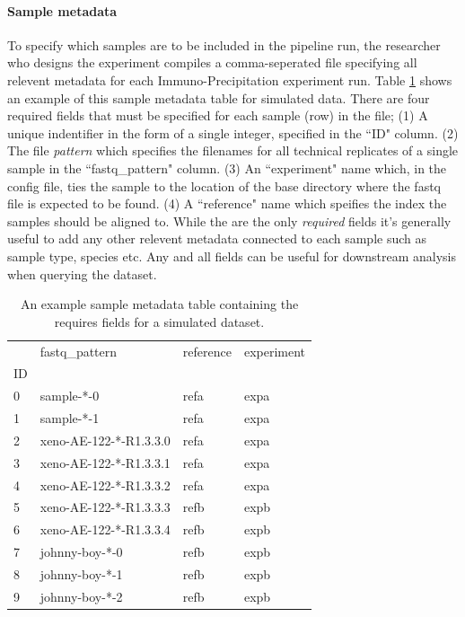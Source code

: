 \documentclass{article}
\begin{document}
\paragraph{Sample metadata}
To specify which samples are to be included in the pipeline run, 
the researcher who designs the experiment compiles a comma-seperated file specifying all relevent metadata for each Immuno-Precipitation experiment run. 
Table \ref{tab:sample_metadata} shows an example of this sample metadata table for simulated data.
There are four required fields that must be specified for each sample (row) in the file;
(1) A unique indentifier in the form of a single integer, specified in the ``ID" column.
(2) The file \textit{pattern} which specifies the filenames for all technical replicates of a single sample in the ``fastq\_pattern" column.
(3) An ``experiment" name which, in the config file, ties the sample to the location of the base directory where the fastq file is expected to be found.
(4) A ``reference" name which speifies the index the samples should be aligned to.
While the are the only \textit{required} fields it's generally useful to add any other relevent metadata connected to each sample such as sample type, species etc.
Any and all fields can be useful for downstream analysis when querying the dataset. 

\begin{table}[h!!!!]
\centering
\begin{tabular}{llll}
\toprule
{} &           fastq\_pattern & reference & experiment \\
ID &                         &           &            \\
\midrule
0  &              sample-*-0 &      refa &       expa \\
1  &              sample-*-1 &      refa &       expa \\
2  &  xeno-AE-122-*-R1.3.3.0 &      refa &       expa \\
3  &  xeno-AE-122-*-R1.3.3.1 &      refa &       expa \\
4  &  xeno-AE-122-*-R1.3.3.2 &      refa &       expa \\
5  &  xeno-AE-122-*-R1.3.3.3 &      refb &       expb \\
6  &  xeno-AE-122-*-R1.3.3.4 &      refb &       expb \\
7  &          johnny-boy-*-0 &      refb &       expb \\
8  &          johnny-boy-*-1 &      refb &       expb \\
9  &          johnny-boy-*-2 &      refb &       expb \\
\bottomrule
\end{tabular}
\caption{An example sample metadata table containing the requires fields for a simulated dataset.}
\label{tab:sample_metadata}
\end{table}
\end{document}
